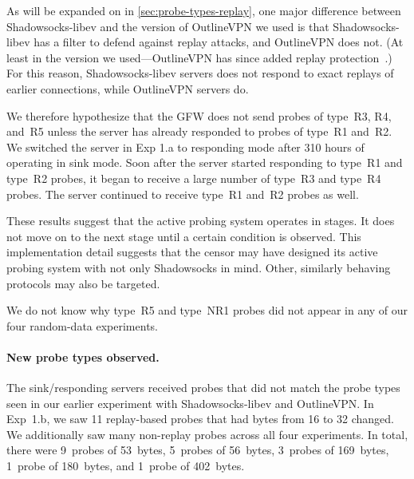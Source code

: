 \documentclass[sigconf,letterpaper]{acmart}
\begin{document}
As will be expanded on in \autoref{sec:probe-types-replay},
one major difference between Shadowsocks-libev and the version of OutlineVPN we used
is that Shadowsocks-libev has a filter to defend against replay attacks,
and OutlineVPN does not.
(At least in the version we used---OutlineVPN has since added replay protection~\cite{outline-v1.1.0}.)
For this reason,
Shadowsocks-libev servers does not respond to exact replays of earlier connections,
while OutlineVPN servers do.

We therefore hypothesize that the GFW does not send probes of type~R3, R4, and~R5
unless the server has already responded to probes of type~R1 and~R2.
We switched the server in Exp 1.a to responding mode after 310 hours of operating in sink mode.
Soon after the server started responding to type~R1 and type~R2 probes,
it began to receive a large number of type~R3 and type~R4 probes.
The server continued to receive type~R1 and~R2 probes as well.

These results suggest that the active probing system operates in stages.
It does not move on to the next stage until a certain condition is observed.
This implementation detail suggests that the censor may have designed its
active probing system with not only Shadowsocks in mind.
Other, similarly behaving protocols may also be targeted.

We do not know why type~R5 and type~NR1 probes did not appear in any of our four random-data experiments.


\paragraph{New probe types observed.}

The sink/responding servers received probes that did not match
the probe types seen in our earlier experiment with Shadowsocks-libev and OutlineVPN.
In Exp~1.b, we saw 11 replay-based probes that had bytes from 16 to 32 changed.
We additionally saw many non-replay probes across all four experiments.
In total, there were
9~probes of 53~bytes,
5~probes of 56~bytes,
3~probes of 169~bytes,
1~probe of 180~bytes, and
1~probe of 402~bytes.
\end{document}
